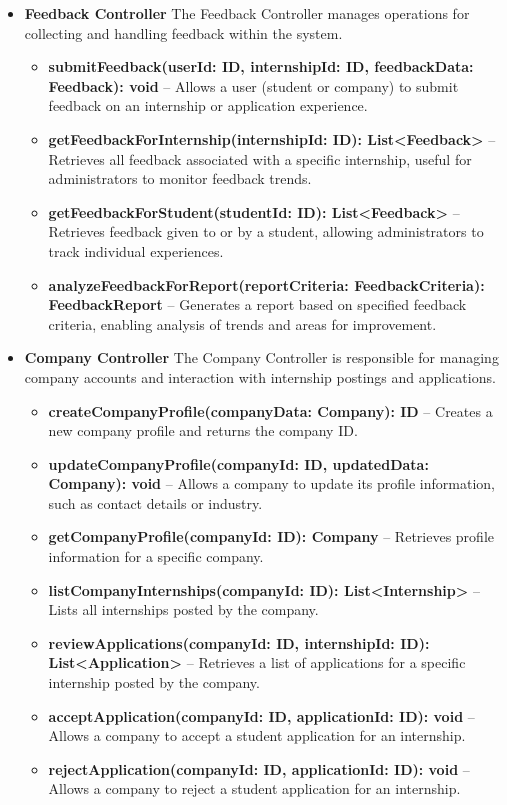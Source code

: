 \begin{itemize}
\item \textbf{Feedback Controller}
The Feedback Controller manages operations for collecting and handling feedback within the system.

\begin{itemize}
    \item \textbf{submitFeedback(userId: ID, internshipId: ID, feedbackData: Feedback): void} – Allows a user (student or company) to submit feedback on an internship or application experience.
    \item \textbf{getFeedbackForInternship(internshipId: ID): List<Feedback>} – Retrieves all feedback associated with a specific internship, useful for administrators to monitor feedback trends.
    \item \textbf{getFeedbackForStudent(studentId: ID): List<Feedback>} – Retrieves feedback given to or by a student, allowing administrators to track individual experiences.
    \item \textbf{analyzeFeedbackForReport(reportCriteria: FeedbackCriteria): FeedbackReport} – Generates a report based on specified feedback criteria, enabling analysis of trends and areas for improvement.
\end{itemize}

\item \textbf{Company Controller}
The Company Controller is responsible for managing company accounts and interaction with internship postings and applications.

\begin{itemize}
    \item \textbf{createCompanyProfile(companyData: Company): ID} – Creates a new company profile and returns the company ID.
    \item \textbf{updateCompanyProfile(companyId: ID, updatedData: Company): void} – Allows a company to update its profile information, such as contact details or industry.
    \item \textbf{getCompanyProfile(companyId: ID): Company} – Retrieves profile information for a specific company.
    \item \textbf{listCompanyInternships(companyId: ID): List<Internship>} – Lists all internships posted by the company.
    \item \textbf{reviewApplications(companyId: ID, internshipId: ID): List<Application>} – Retrieves a list of applications for a specific internship posted by the company.
    \item \textbf{acceptApplication(companyId: ID, applicationId: ID): void} – Allows a company to accept a student application for an internship.
    \item \textbf{rejectApplication(companyId: ID, applicationId: ID): void} – Allows a company to reject a student application for an internship.
\end{itemize}
\newpage

\end{itemize}


